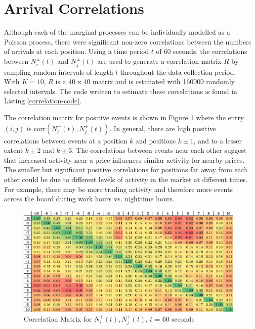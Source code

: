 \section{Arrival Correlations}\label{ch:correlations}
Although each of the marginal processes can be individually modelled as a Poisson process, there were significant non-zero correlations between the numbers of arrivals at each position. Using a time period $t$ of 60 seconds, the correlations between $N^{\pm}_i(t)$ and $N^{\pm}_j(t)$ are used to generate a correlation matrix $R$ by sampling random intervals of length $t$ throughout the data collection period. With $K=10$, $R$ is a 40 x 40 matrix and is estimated with 160000 randomly selected intervals. The code written to estimate these correlations is found in Listing \ref{correlation-code}.

The correlation matrix for positive events is shown in Figure \ref{fig:pos_pos_corr_pic} where the entry $(i,j)$ is $\text{corr}(N^{+}_i(t), N^{+}_j(t))$. In general, there are high positive correlations between events at a position $k$ and positions $k \pm 1$, and to a lesser extent $k \pm 2$ and $k \pm 3$. The correlations between events near each other suggest that increased activity near a price influences similar activity for nearby prices. The smaller but significant positive correlations for positions far away from each other could be due to different levels of activity in the market at different times. For example, there may be more trading activity and therefore more events across the board during work hours vs. nighttime hours.

\begin{figure}[t]
\begin{center}
\caption{Correlation Matrix for $N^{+}_i(t), N^{+}_j(t)$, $t$ = 60 seconds}
\label{fig:pos_pos_corr_pic}
\includegraphics[width=\textwidth]{LaTeX/Figures/pos_pos_correlations.png}
\end{center}
\end{figure}

